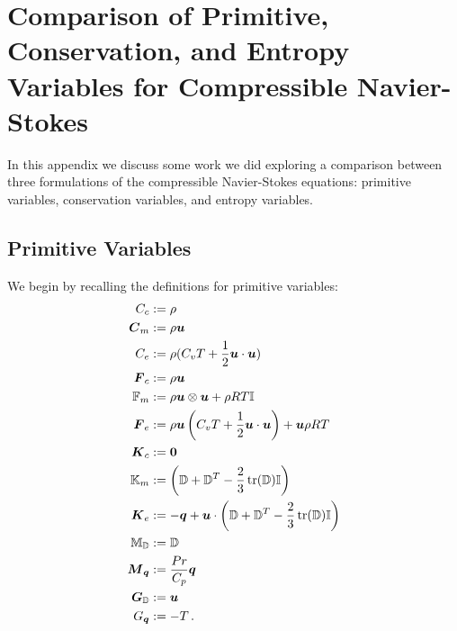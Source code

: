 \documentclass[Dissertation.tex]{subfiles}
\begin{document}
\chapter{Comparison of Primitive, Conservation, and Entropy Variables for Compressible Navier-Stokes}
\label{sec:VariableComparison}
In this appendix we discuss some work we did exploring a comparison between three formulations of the 
compressible Navier-Stokes equations: primitive variables, conservation variables, and entropy variables.

\section{Primitive Variables}
We begin by recalling the definitions for primitive variables:
\begin{align*}
C_c&:=\rho\\
\boldsymbol C_m&:=\rho\boldsymbol u\\
C_e&:=\rho(C_v T+\frac{1}{2}\boldsymbol u\cdot\boldsymbol u)\\
\boldsymbol F_c&:=\rho\boldsymbol u\\
\mathbb{F}_m&:=\rho\boldsymbol u\otimes\boldsymbol u+\rho RT\mathbb{I}\\
\boldsymbol F_e&:=\rho\boldsymbol u\left( C_v T+\frac{1}{2}\boldsymbol u\cdot\boldsymbol u \right)+\boldsymbol u\rho RT\\
\boldsymbol K_c&:=\boldsymbol 0\\
\mathbb{K}_m&:=\left( \mathbb{D}+\mathbb{D}^T-\frac{2}{3}\operatorname*{tr}(\mathbb{D})\mathbb{I} \right)\\
\boldsymbol K_e&:=-\boldsymbol q+\boldsymbol u\cdot\left( \mathbb{D}+\mathbb{D}^T-\frac{2}{3}\operatorname*{tr}(\mathbb{D})\mathbb{I} \right)\\
\mathbb{M}_{\mathbb{D}}&:=\mathbb{D}\\
\boldsymbol M_{\boldsymbol q}&:=\frac{Pr}{C_p}\boldsymbol q\\
\boldsymbol G_{\mathbb{D}}&:=\boldsymbol u\\
G_{\boldsymbol q}&:=-T\,.
\end{align*}
\end{document}
